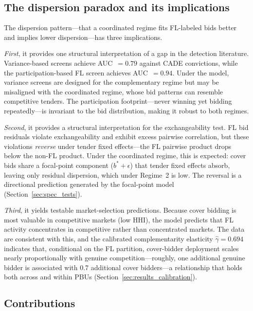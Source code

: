 \subsection{The dispersion paradox and its implications}

The dispersion pattern---that a coordinated regime fits FL-labeled
bids better and implies lower dispersion---has three implications.

\emph{First}, it provides one structural interpretation of a gap in
the detection literature. Variance-based screens
\citep{imhof2019detecting} achieve AUC~$= 0.79$ against CADE
convictions, while the participation-based FL screen achieves
AUC~$= 0.94$. Under the model, variance screens are designed for
the complementary regime but may be misaligned with the coordinated
regime, whose bid patterns can resemble competitive tenders. The
participation footprint---never winning yet bidding repeatedly---is
invariant to the bid distribution, making it robust to both regimes.

\emph{Second}, it provides a structural interpretation for the
\citet{bajari2003deciding} exchangeability test. FL bid residuals
violate exchangeability and exhibit excess pairwise correlation,
but these violations \emph{reverse} under tender fixed effects---the
FL pairwise product drops below the non-FL product. Under the
coordinated regime, this is expected: cover bids share a
focal-point component ($b^* + \epsilon$) that tender fixed effects
absorb, leaving only residual dispersion, which under Regime~2 is
low. The reversal is a directional prediction generated by the
focal-point model (Section~\ref{sec:spec_tests}).

\emph{Third}, it yields testable market-selection predictions.
Because cover bidding is most valuable in competitive markets (low
HHI), the model predicts that FL activity concentrates in
competitive rather than concentrated markets. The data are
consistent with this, and the calibrated complementarity elasticity
$\hat{\gamma} = 0.694$ indicates that, conditional on the FL
partition, cover-bidder deployment scales nearly proportionally with
genuine competition---roughly, one additional genuine bidder is
associated with 0.7 additional cover bidders---a relationship that
holds both across and within PBUs
(Section~\ref{sec:results_calibration}).

\subsection{Contributions}

